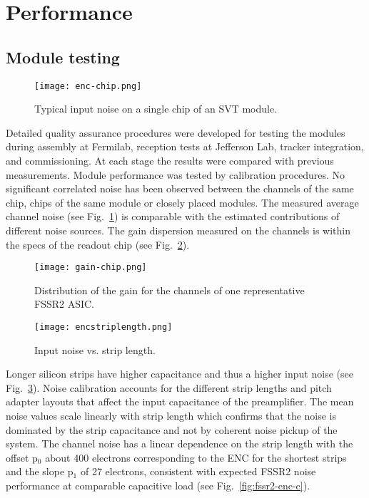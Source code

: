 \section{Performance}

\subsection{Module testing}

\begin{figure}[hbt] 
\centering 
\texttt{[image: enc-chip.png]}
\caption{Typical input noise on a single chip of an SVT module.}
\label{fig:enc-chip}
\end{figure} 

Detailed quality assurance procedures were developed for testing the modules during assembly at Fermilab, reception tests at Jefferson Lab, tracker integration, and commissioning. At each stage the results were compared with previous measurements. Module performance was tested by calibration procedures. No significant correlated noise has been observed between the channels of the same chip, chips of the same module or closely placed modules. The measured average channel noise (see Fig.~\ref{fig:enc-chip}) is comparable with the estimated contributions of different noise sources. The gain dispersion measured on the channels is within the specs of the readout chip (see Fig.~\ref{fig:gain-chip}).

\begin{figure}[hbt] 
\centering 
\texttt{[image: gain-chip.png]}
\caption{Distribution of the gain for the channels of one representative FSSR2 ASIC.}
\label{fig:gain-chip}
\end{figure}

\begin{figure}[hbt] 
	\centering 
	\texttt{[image: encstriplength.png]}
	\caption{Input noise vs. strip length.}
	\label{fig:encstriplength}
\end{figure}

Longer silicon strips have higher capacitance and thus a higher input noise (see Fig.~\ref{fig:encstriplength}). Noise calibration accounts for the different strip lengths and pitch adapter layouts that affect the input capacitance of the preamplifier. The mean noise values scale linearly with strip length which confirms that the noise is dominated by the strip capacitance and not by coherent noise pickup of the system. The channel noise has a linear dependence on the strip length with the offset p$_{0}$ about 400 electrons corresponding to the ENC for the shortest strips and the slope p$_1$ of 27 electrons, consistent with expected FSSR2 noise performance at comparable capacitive load (see Fig.~\ref{fig:fssr2-enc-c}).

